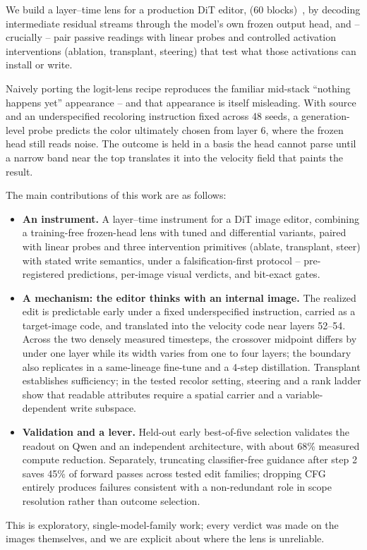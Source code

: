 We build a layer--time lens for a production DiT editor,
\model{} (60 blocks)~\citep{peebles2023dit,qwen2025image}, by decoding intermediate residual streams through
the model's own frozen output head, and -- crucially -- pair passive
readings with linear probes and controlled activation
interventions (ablation, transplant, steering) that test what those
activations can install or write.

Naively porting the logit-lens recipe reproduces the familiar mid-stack
``nothing happens yet'' appearance -- and that appearance is itself
misleading. With source and an underspecified recoloring instruction
fixed across 48 seeds, a generation-level probe predicts the color
ultimately chosen from layer 6, where the frozen head still reads noise.
The outcome is held in a basis the head cannot parse until a narrow band
near the top translates it into the velocity field that paints the result.

The main contributions of this work are as follows:
\begin{itemize}
\item \textbf{An instrument.} A layer--time instrument for a DiT image
editor, combining a training-free frozen-head lens with tuned and
differential variants,
paired with linear probes and three intervention primitives (ablate,
transplant, steer) with stated write semantics, under a
falsification-first protocol -- pre-registered predictions, per-image
visual verdicts, and bit-exact gates.
\item \textbf{A mechanism: the editor thinks with an internal image.}
The realized edit is predictable early under a fixed underspecified
instruction, carried as a target-image code, and translated into the
velocity code near layers 52--54. Across the two densely measured
timesteps, the crossover midpoint differs by under one layer while its
width varies from one to four layers; the boundary also replicates in a
same-lineage fine-tune and a 4-step distillation. Transplant establishes
sufficiency; in the tested recolor setting, steering and a rank ladder show
that readable attributes require a spatial carrier and a
variable-dependent write subspace.
\item \textbf{Validation and a lever.} Held-out early best-of-five selection
validates the readout on Qwen and an independent architecture, with about
68\% measured compute reduction. Separately, truncating classifier-free
guidance after step 2 saves 45\% of forward passes across tested edit
families; dropping CFG entirely produces failures consistent with a
non-redundant role in scope resolution rather than outcome selection.
\end{itemize}
This is exploratory, single-model-family work; every verdict was made
on the images themselves, and we are explicit about where the lens is
unreliable.
